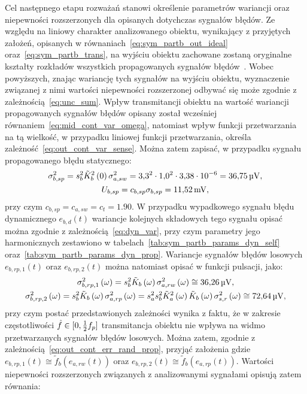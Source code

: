 Cel następnego etapu rozważań stanowi określenie parametrów wariancji oraz niepewności rozszerzonych dla opisanych dotychczas sygnałów błędów. Ze względu na liniowy charakter analizowanego obiektu, wynikający z przyjętych założeń, opisanych w równaniach~\eqref{eq:sym_partb_out_ideal} oraz~\eqref{eq:sym_partb_trans}, na wyjściu obiektu zachowane zostaną oryginalne kształty rozkładów wszystkich propagowanych sygnałów błędów~\cite{grimmett_probability, oppenheim_sns}. Wobec powyższych, znając wariancję tych sygnałów na wyjściu obiektu, wyznaczenie związanej z nimi wartości niepewności rozszerzonej odbywać się może zgodnie z zależnością~\eqref{eq:unc_sum}. Wpływ transmitancji obiektu na wartość wariancji propagowanych sygnałów błędów opisany został wcześniej równaniem~\eqref{eq:mid_cont_var_omega}, natomiast wpływ funkcji przetwarzania na tą wielkość, w przypadku liniowej funkcji przetwarzania, określa zależność~\eqref{eq:out_cont_var_sense}. Można zatem zapisać, w przypadku sygnału propagowanego błędu statycznego:
\begin{gather}
\sigma_{b,sp}^{2} = s_{b}^{2} \tilde{K}_{b}^{2} \left(0\right) \sigma_{a,sw}^{2} = \num{3.3}^{2} \cdot \num{1.0}^{2} \cdot \num{3.38e-6} = \qty{36.75}{\micro V} \label{eq:sym_partb_var_stat_prop}, \\
U_{b,sp} = c_{b,sp} \sigma_{b,sp} = \qty{11.52}{mV} \label{eq:sym_partb_unc_stat_prop},
\end{gather}
przy czym $c_{b,sp} = c_{a,sw} = c_{t} = \num{1.90}$. W przypadku wypadkowego sygnału błędu dynamicznego $e_{b,d}(t)$ wariancje kolejnych składowych tego sygnału opisać można zgodnie z zależnością~\eqref{eq:dyn_var}, przy czym parametry jego harmonicznych zestawiono w tabelach~\ref{tab:sym_partb_params_dyn_self} oraz~\ref{tab:sym_partb_params_dyn_prop}. Wariancje sygnałów błędów losowych $e_{b,rp,1}(t)$ oraz $e_{b,rp,2}(t)$ można natomiast opisać w funkcji pulsacji, jako:
\begin{gather}
\sigma_{b,rp,1}^{2} \left(\omega\right) = s_{b}^{2} \tilde{K}_{b} \left(\omega\right) \sigma_{a,rw}^{2} \left(\omega\right) \cong \qty{36.26}{\micro V} \label{eq:sym_partb_var_rand_prop_1}, \\
\sigma_{b,rp,2}^{2} \left(\omega\right) = s_{b}^{2} \tilde{K}_{b} \left(\omega\right) \sigma_{a,rp}^{2} \left(\omega\right) = s_{a}^{2} s_{b}^{2} \tilde{K}_{a}^{2} \left(\omega\right) \tilde{K}_{b} \left(\omega\right) \sigma_{s,r}^{2} \left(\omega\right) \cong \qty{72.64}{\micro V} \label{eq:sym_partb_var_rand_prop_2},
\end{gather}
przy czym postać przedstawionych zależności wynika z faktu, że w zakresie częstotliwości $\hat{f} \in \interval{0}{\frac{1}{2} f_{p}}$ transmitancja obiektu nie wpływa na widmo przetwarzanych sygnałów błędów losowych. Można zatem, zgodnie z zależnością~\eqref{eq:out_cont_err_rand_prop}, przyjąć założenia gdzie $e_{b,rp,1}(t) \cong \tilde{f}_{b}(e_{a,rw}(t))$ oraz $e_{b,rp,2}(t) \cong \tilde{f}_{b}(e_{a,rp}(t))$. Wartości niepewności rozszerzonych związanych z analizowanymi sygnałami opisują zatem równania:

